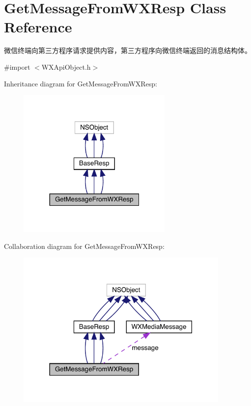 \hypertarget{interface_get_message_from_w_x_resp}{}\section{Get\+Message\+From\+W\+X\+Resp Class Reference}
\label{interface_get_message_from_w_x_resp}


微信终端向第三方程序请求提供内容，第三方程序向微信终端返回的消息结构体。  




{\ttfamily \#import $<$W\+X\+Api\+Object.\+h$>$}



Inheritance diagram for Get\+Message\+From\+W\+X\+Resp\+:\nopagebreak
\begin{figure}[H]
\begin{center}
\leavevmode
\includegraphics[width=215pt]{interface_get_message_from_w_x_resp__inherit__graph}
\end{center}
\end{figure}


Collaboration diagram for Get\+Message\+From\+W\+X\+Resp\+:\nopagebreak
\begin{figure}[H]
\begin{center}
\leavevmode
\includegraphics[width=297pt]{interface_get_message_from_w_x_resp__coll__graph}
\end{center}
\end{figure}
